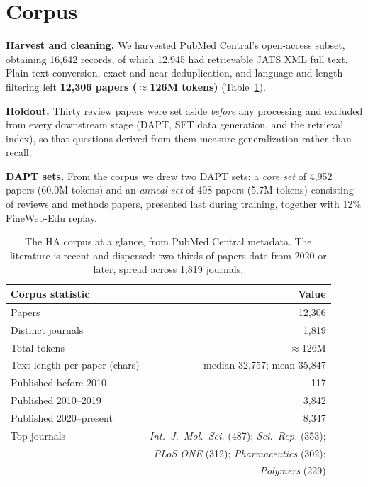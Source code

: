 \documentclass[11pt]{article}
\begin{document}
\section{Corpus}
\label{sec:corpus}

\textbf{Harvest and cleaning.} We harvested PubMed Central's
open-access subset, obtaining 16,642 records, of which 12,945 had
retrievable JATS XML full text. Plain-text conversion, exact and near
deduplication, and language and length filtering left \textbf{12,306
papers ($\approx$126M tokens)} (Table~\ref{tab:corpus}).

\textbf{Holdout.} Thirty review papers were set aside \emph{before}
any processing and excluded from every downstream stage (DAPT, SFT
data generation, and the retrieval index), so that questions derived
from them measure generalization rather than recall.

\textbf{DAPT sets.} From the corpus we drew two DAPT sets: a
\emph{core set} of 4,952 papers (60.0M tokens) and an \emph{anneal set}
of 498 papers (5.7M tokens) consisting of reviews and methods papers,
presented last during training, together with 12\% FineWeb-Edu replay.

\begin{table}[t]
\centering
\begin{tabular}{lr}
\toprule
Corpus statistic & Value \\
\midrule
Papers & 12,306 \\
Distinct journals & 1,819 \\
Total tokens & $\approx$126M \\
Text length per paper (chars) & median 32,757; mean 35,847 \\
\midrule
Published before 2010 & 117 \\
Published 2010--2019 & 3,842 \\
Published 2020--present & 8,347 \\
\midrule
Top journals & \emph{Int.\ J.\ Mol.\ Sci.} (487); \emph{Sci.\ Rep.} (353); \\
 & \emph{PLoS ONE} (312); \emph{Pharmaceutics} (302); \\
 & \emph{Polymers} (229) \\
\bottomrule
\end{tabular}
\caption{The HA corpus at a glance, from PubMed Central metadata. The
literature is recent and dispersed: two-thirds of papers date from 2020
or later, spread across 1,819 journals.}
\label{tab:corpus}
\end{table}
\end{document}
